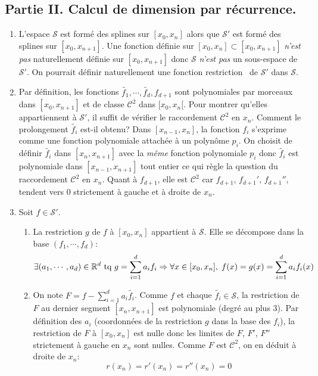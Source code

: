 \subsection*{Partie II. Calcul de dimension par récurrence.}
\begin{enumerate}
  \item L'espace $\mathcal{S}$ est formé des splines sur $[x_0,x_n]$ alors que $\mathcal{S}'$ est formé des splines sur $[x_0,x_{n+1}]$. Une fonction définie sur $[x_0,x_n]\subset [x_0,x_{n+1}]$ \emph{n'est pas} naturellement définie sur $[x_0,x_{n+1}]$ donc $\mathcal{S}$ \emph{n'est pas} un sous-espace de $\mathcal{S}'$. \newline
  On pourrait définir naturellement une fonction \og restriction\fg~ de $\mathcal{S}'$ dans $\mathcal{S}$.

  \item Par définition, les fonctions $\widetilde{f_1}, \cdots , \widetilde{f_d}, f_{d+1}$ sont polynomiales par morceaux dans $[x_0, x_{n+1}]$ et de classe $\mathcal{C}^2$ dans $[x_0,x_n[$. Pour montrer qu'elles appartiennent à $\mathcal{S}'$, il suffit de vérifier le raccordement $\mathcal{C}^2$ en $x_n$.\newline
Comment le prolongement $\widetilde{f_i}$ est-il obtenu?\newline
Dans $[x_{n-1},x_n]$, la fonction $f_i$ s'exprime comme une fonction polynomiale attachée à un polynôme $p_i$. On choisit de définir $\widetilde{f_i}$ dans $[x_{n},x_{n+1}]$ avec la \emph{même} fonction polynomiale $p_i$ donc $\widetilde{f_i}$ est polynomiale dans $[x_{n-1},x_{n+1}]$ tout entier ce qui règle la question du raccordement $\mathcal{C}^2$ en $x_n$.\newline
Quant à $f_{d+1}$, elle est $\mathcal{C}^2$ car $f_{d+1}$, $f_{d+1}'$, $f_{d+1}''$, tendent vers $0$ strictement à gauche et à droite de $x_n$.

  \item Soit $f\in \mathcal{S}'$.
\begin{enumerate}
  \item La restriction $g$ de $f$ à $[x_0,x_n]$ appartient à $\mathcal{S}$. Elle se décompose dans la base $(f_1,\cdots,f_d)$:
\begin{displaymath}
\exists (a_1,\cdots,a_d)\in \mathbb{R}^d \text{ tq }
g = \sum_{i=1}^{d} a_if_i
\Rightarrow
\forall x \in [x_0,x_n],\; f(x)=g(x)=\sum_{i=1}^{d} a_if_i(x)
\end{displaymath}

  \item On note $F = f-\sum\limits_{i=1}^{d} a_i \widetilde{f_i}$. Comme $f$ et chaque $\widetilde{f_i}\in \mathcal{S}$, la restriction de $F$ au dernier segment $[x_n,x_{n+1}]$ est polynomiale (degré au plus $3$).\newline
Par définition des $a_i$ (coordonnées de la restriction $g$ dans la base des $f_i$), la restriction de $F$ à $[x_0,x_n]$ est nulle donc les limites de $F$, $F'$, $F''$ strictement à gauche en $x_n$ sont nulles. Comme $F$ est $\mathcal{C}^2$, on en déduit à droite de $x_n$:
\begin{displaymath}
  r(x_n) = r'(x_n) = r''(x_n)=0
\end{displaymath}
\end{enumerate}


\end{enumerate}
